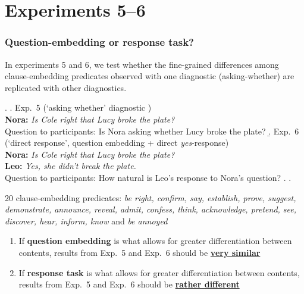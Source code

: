 \documentclass[compress, xcolor = dvipsnames, aspectratio=169, handout]{beamer}
\begin{document}
\section{Experiments 5–6}

	\begin{frame}[t]\frametitle{Question-embedding or response task?}\scriptsize
	

		In experiments 5 and 6, we test whether the fine-grained differences among clause-embedding predicates observed with one diagnostic (asking-whether) are replicated with other diagnostics.

		\ex.
		    \a.\label{exp5} Exp.~5 (`asking whether' diagnostic )
		    \\ {\bf Nora:} \emph{Is Cole right that Lucy broke the plate?}
		    \\ Question to participants: Is Nora asking whether Lucy broke the plate?\smallskip
		    \b.\label{exp6} Exp.~6 (`direct response', question embedding + direct \emph{yes}-response)
		    \\ {\bf Nora:} \emph{Is Cole right that Lucy broke the plate?}
		    \\ {\bf Leo:} \emph{Yes, she didn't break the plate.}
		    \\ Question to participants: How natural is Leo's response to Nora's question?
		    \z. \z. 
	
		\vfill
		20 clause-embedding predicates: \emph{be right, confirm, say, establish, prove, suggest, demonstrate, announce, reveal, admit, confess, think, acknowledge, pretend, see, discover, hear, inform, know} and \emph{be annoyed}\vfill

		\begin{enumerate}
			\item If \textbf{question embedding} is what allows for greater differentiation between contents, results from Exp.~5 and Exp.~6 should be \textbf{\underline{very similar}}

			\item If \textbf{response task} is what allows for greater differentiation between contents, results from Exp.~5 and Exp.~6 should be \textbf{\underline{rather different}}
		\end{enumerate}

	\end{frame}
\end{document}
